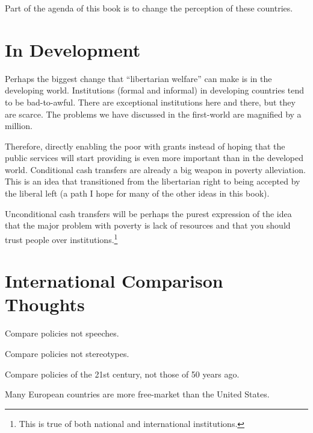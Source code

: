 Part of the agenda of this book is to change the perception of these countries.

\section{In Development}

Perhaps the biggest change that ``libertarian welfare'' can make is in the
developing world. Institutions (formal and informal) in developing countries
tend to be bad-to-awful. There are exceptional institutions here and there, but
they are scarce. The problems we have discussed in the first-world are
magnified by a million.

Therefore, directly enabling the poor with grants instead of hoping that the
public services will start providing is even more important than in the
developed world. Conditional cash transfers are already a big weapon in poverty
alleviation.  This is an idea that transitioned from the libertarian right to
being accepted by the liberal left (a path I hope for many of the other ideas
in this book).

Unconditional cash transfers will be perhaps the purest expression of the idea
that the major problem with poverty is lack of resources and that you should
trust people over institutions.\footnote{This is true of both national and
international institutions.} 

\section{International Comparison Thoughts}

\thought Compare policies not speeches.

\thought Compare policies not stereotypes.

\thought Compare policies of the 21st century, not those of 50 years ago.

\thought Many European countries are more free-market than the United States.

